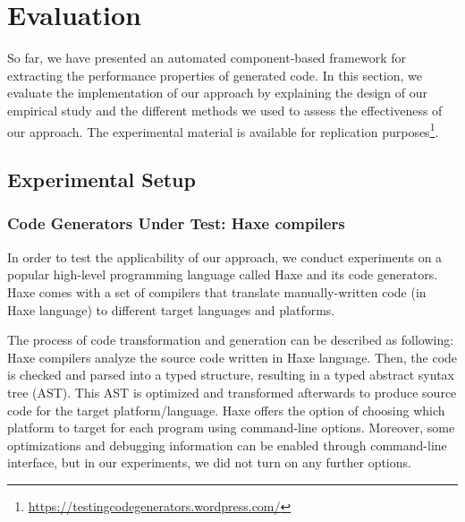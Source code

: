 \section{Evaluation}
So far, we have presented an automated component-based framework for extracting the performance properties of generated code. In this section, we evaluate the implementation of our approach by explaining the design of our empirical study and the different methods we used to assess the effectiveness of our approach. 
The experimental material is available for replication purposes\footnote{\url{https://testingcodegenerators.wordpress.com/}}.
\subsection{Experimental Setup}
\subsubsection{Code Generators Under Test: Haxe compilers}
In order to test the applicability of our approach, we conduct experiments on a popular high-level programming language called Haxe and its code generators. 
Haxe comes with a set of compilers that translate manually-written code (in Haxe language) to different target languages and platforms. 

The process of code transformation and generation can be described as following: Haxe compilers analyze the source code written in Haxe language. Then, the code is checked and parsed into a typed structure, resulting in a typed abstract syntax tree (AST). This AST is optimized and transformed afterwards to produce source code for the target platform/language.
Haxe offers the option of choosing which platform to target for each program using command-line options. Moreover, some optimizations and debugging information can be enabled through command-line interface, but in our experiments, we did not turn on any further options. 

